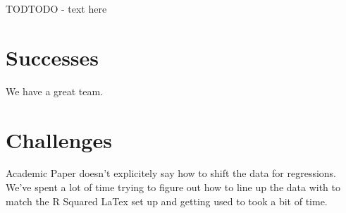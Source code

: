 \documentclass[12pt]{article}
\begin{document}
TODTODO - text here


\doublespacing
\section{Successes}

We have a great team. 



\doublespacing
\section{Challenges}

Academic Paper doesn't explicitely say how to shift the data for regressions. 
We've spent a lot of time trying to figure out how to line up the data with to match the R Squared
LaTex set up and getting used to took a bit of time. 
\end{document}
